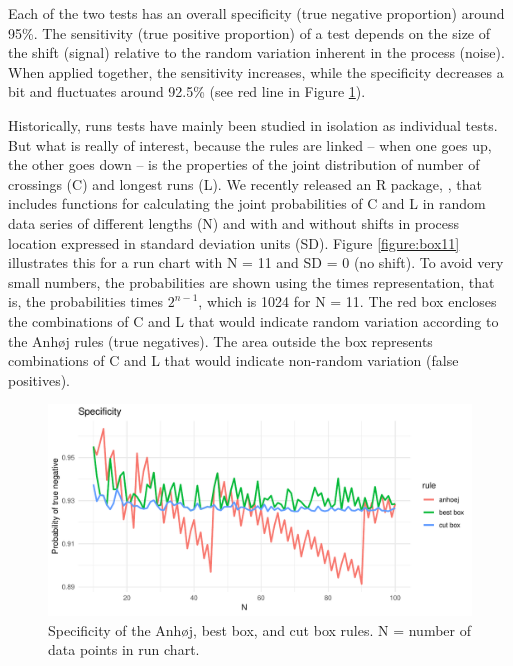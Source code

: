 Each of the two tests has an overall specificity (true negative
proportion) around 95\%. The sensitivity (true positive proportion) of a
test depends on the size of the shift (signal) relative to the random
variation inherent in the process (noise). When applied together, the
sensitivity increases, while the specificity decreases a bit and
fluctuates around 92.5\% (see red line in Figure \ref{figure:spec}).

Historically, runs tests have mainly been studied in isolation as
individual tests. But what is really of interest, because the rules are
linked -- when one goes up, the other goes down -- is the properties of
the joint distribution of number of crossings (C) and longest runs (L).
We recently released an R package,  \citep{twl2018},
that includes functions for calculating the joint probabilities of C and
L in random data series of different lengths (N) and with and without
shifts in process location expressed in standard deviation units (SD).
Figure \ref{figure:box11} illustrates this for a run chart with N = 11
and SD = 0 (no shift). To avoid very small numbers, the probabilities
are shown using the times representation, that is, the probabilities
times \(2^{n-1}\), which is 1024 for N = 11. The red box encloses the
combinations of C and L that would indicate random variation according
to the Anhøj rules (true negatives). The area outside the box represents
combinations of C and L that would indicate non-random variation (false
positives).

\begin{figure}[htbp]
  \centering
  \includegraphics[width=\textwidth]{fig_spec.pdf}
  \caption{Specificity of the Anhøj, best box, and cut box rules. N = number of data points in run chart. }
  \label{figure:spec}
\end{figure}

